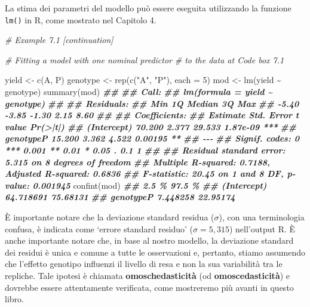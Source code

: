 \documentclass[
  12pt,
]{book}
\newenvironment{Shaded}{\begin{snugshade}}{\end{snugshade}}
\newcommand{\AttributeTok}[1]{\textcolor[rgb]{0.77,0.63,0.00}{#1}}
\newcommand{\CommentTok}[1]{\textcolor[rgb]{0.56,0.35,0.01}{\textit{#1}}}
\newcommand{\DecValTok}[1]{\textcolor[rgb]{0.00,0.00,0.81}{#1}}
\newcommand{\DocumentationTok}[1]{\textcolor[rgb]{0.56,0.35,0.01}{\textbf{\textit{#1}}}}
\newcommand{\FunctionTok}[1]{\textcolor[rgb]{0.00,0.00,0.00}{#1}}
\newcommand{\NormalTok}[1]{#1}
\newcommand{\OtherTok}[1]{\textcolor[rgb]{0.56,0.35,0.01}{#1}}
\newcommand{\SpecialCharTok}[1]{\textcolor[rgb]{0.00,0.00,0.00}{#1}}
\newcommand{\StringTok}[1]{\textcolor[rgb]{0.31,0.60,0.02}{#1}}
\begin{document}
La stima dei parametri del modello può essere eseguita utilizzando la funzione \texttt{lm()} in R, come mostrato nel Capitolo 4.

\begin{Shaded}
\begin{Highlighting}[]
\CommentTok{\# Example 7.1 [continuation]}

\CommentTok{\# Fitting a model with one nominal predictor}
\CommentTok{\# to the data at Code box 7.1}

\NormalTok{yield }\OtherTok{\textless{}{-}} \FunctionTok{c}\NormalTok{(A, P)}
\NormalTok{genotype }\OtherTok{\textless{}{-}} \FunctionTok{rep}\NormalTok{(}\FunctionTok{c}\NormalTok{(}\StringTok{"A"}\NormalTok{, }\StringTok{"P"}\NormalTok{), }\AttributeTok{each =} \DecValTok{5}\NormalTok{)}
\NormalTok{mod }\OtherTok{\textless{}{-}} \FunctionTok{lm}\NormalTok{(yield }\SpecialCharTok{\textasciitilde{}}\NormalTok{ genotype)}
\FunctionTok{summary}\NormalTok{(mod)}
\DocumentationTok{\#\# }
\DocumentationTok{\#\# Call:}
\DocumentationTok{\#\# lm(formula = yield \textasciitilde{} genotype)}
\DocumentationTok{\#\# }
\DocumentationTok{\#\# Residuals:}
\DocumentationTok{\#\#    Min     1Q Median     3Q    Max }
\DocumentationTok{\#\#  {-}5.40  {-}3.85  {-}1.30   2.15   8.60 }
\DocumentationTok{\#\# }
\DocumentationTok{\#\# Coefficients:}
\DocumentationTok{\#\#             Estimate Std. Error t value Pr(\textgreater{}|t|)    }
\DocumentationTok{\#\# (Intercept)   70.200      2.377  29.533 1.87e{-}09 ***}
\DocumentationTok{\#\# genotypeP     15.200      3.362   4.522  0.00195 ** }
\DocumentationTok{\#\# {-}{-}{-}}
\DocumentationTok{\#\# Signif. codes:  0 \textquotesingle{}***\textquotesingle{} 0.001 \textquotesingle{}**\textquotesingle{} 0.01 \textquotesingle{}*\textquotesingle{} 0.05 \textquotesingle{}.\textquotesingle{} 0.1 \textquotesingle{} \textquotesingle{} 1}
\DocumentationTok{\#\# }
\DocumentationTok{\#\# Residual standard error: 5.315 on 8 degrees of freedom}
\DocumentationTok{\#\# Multiple R{-}squared:  0.7188, Adjusted R{-}squared:  0.6836 }
\DocumentationTok{\#\# F{-}statistic: 20.45 on 1 and 8 DF,  p{-}value: 0.001945}
\FunctionTok{confint}\NormalTok{(mod)}
\DocumentationTok{\#\#                 2.5 \%   97.5 \%}
\DocumentationTok{\#\# (Intercept) 64.718691 75.68131}
\DocumentationTok{\#\# genotypeP    7.448258 22.95174}
\end{Highlighting}
\end{Shaded}

È importante notare che la deviazione standard residua (\(\sigma\)), con una terminologia confusa, è indicata come `errore standard residuo' (\(\sigma = 5,315\)) nell'output R. È anche importante notare che, in base al nostro modello, la deviazione standard dei residui è unica e comune a tutte le osservazioni e, pertanto, stiamo assumendo che l'effetto genotipo influenzi il livello di resa e non la sua variabilità tra le repliche. Tale ipotesi è chiamata \textbf{omoschedasticità} (od \textbf{omoscedasticità}) e dovrebbe essere attentamente verificata, come mostreremo più avanti in questo libro.
\end{document}
